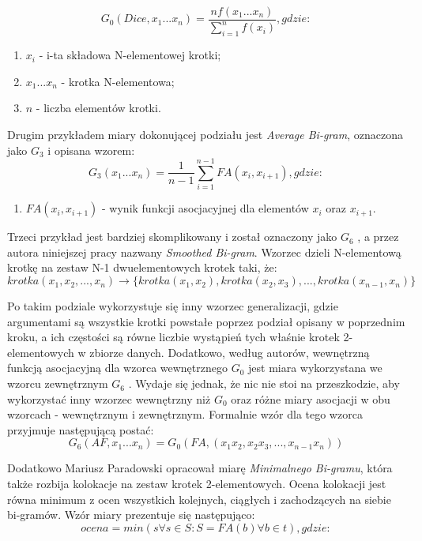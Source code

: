 $$ G_{0}(Dice, x_{1} ... x_{n}) = \frac{nf(x_{1} ... x_{n})}{\sum_{i = 1}^{n} f(x_{i})}, gdzie: $$

\begin{enumerate}
	\item $ x_{i} $ - i-ta składowa N-elementowej krotki;
	\item $ x_{1} ... x_{n} $ - krotka N-elementowa;
	\item $ n $ - liczba elementów krotki.
\end{enumerate}

\par
Drugim przykładem miary dokonującej podziału jest \emph{Average Bi-gram}, oznaczona jako $ G_{3} $ \cite[str. 5]{generalization_patterns} i opisana wzorem:
$$ G_{3}(x_{1} ... x_{n}) = \frac{1}{n - 1} \sum_{i = 1}^{n-1} FA(x_{i}, x_{i + 1}), gdzie: $$

\begin{enumerate}
	\item \( FA(x_{i}, x_{i + 1}) \) - wynik funkcji asocjacyjnej dla elementów \( x_{i} \) oraz \( x_{i + 1} \).
\end{enumerate}

\par
Trzeci przykład jest bardziej skomplikowany i został oznaczony jako $ G_{6} $ \cite[str. 5]{generalization_patterns}, a przez autora niniejszej pracy nazwany \emph{Smoothed Bi-gram}.
Wzorzec dzieli N-elementową krotkę na zestaw N-1 dwuelementowych krotek taki, że:
$$ krotka(x_{1}, x_{2}, ..., x_{n}) \rightarrow \{krotka(x_{1}, x_{2}), krotka(x_{2}, x_{3}), ..., krotka(x_{n - 1}, x_{n})\} $$

Po takim podziale wykorzystuje się inny wzorzec generalizacji, gdzie argumentami są wszystkie krotki powstałe poprzez podział opisany w poprzednim kroku, a ich częstości są równe liczbie wystąpień tych właśnie krotek 2-elementowych w zbiorze danych.
Dodatkowo, według autorów, wewnętrzną funkcją asocjacyjną dla wzorca wewnętrznego \( G_{0} \) jest miara wykorzystana we wzorcu zewnętrznym \( G_{6} \) \cite[str. 5]{generalization_patterns}.
Wydaje się jednak, że nic nie stoi na przeszkodzie, aby wykorzystać inny wzorzec wewnętrzny niż \( G_{0} \) oraz różne miary asocjacji w obu wzorcach - wewnętrznym i zewnętrznym.
Formalnie wzór dla tego wzorca przyjmuje następującą postać:
$$ G_{6}(AF, x_{1} ... x_{n}) = G_{0}(FA, (x_{1}x_{2}, x_{2}x_{3}, ..., x_{n - 1}x_{n})) $$

\par
Dodatkowo Mariusz Paradowski opracował miarę \emph{Minimalnego Bi-gramu}, która także rozbija kolokacje na zestaw krotek 2-elementowych.
Ocena kolokacji jest równa minimum z ocen wszystkich kolejnych, ciągłych i zachodzących na siebie bi-gramów.
Wzór miary prezentuje się następująco:
$$ ocena = min(s \forall s \in S : S = {FA(b) \forall b \in t}), gdzie: $$


